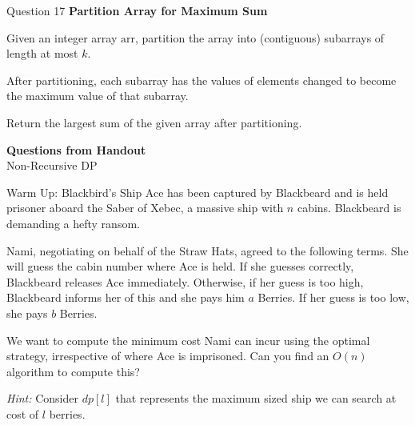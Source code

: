 \documentclass{beamer}
\begin{document}
\begin{frame}{}
\end{frame}
\begin{frame}{}
\end{frame}

\begin{frame}{Question 17}
\textbf{Partition Array for Maximum Sum}

Given an integer array $\text{arr}$, partition the array into (contiguous) subarrays of length at most $k$. 

After partitioning, each subarray has the values of elements changed to become the maximum value of that subarray.

Return the largest sum of the given array after partitioning.
\end{frame}

\begin{frame}{}
\end{frame}
\begin{frame}{}
\end{frame}


\begin{frame}
  \begin{center}
    \Large\textbf{Questions from Handout}\\
    \large Non-Recursive DP
  \end{center}
\end{frame}

\begin{frame}{Warm Up: Blackbird's Ship}
Ace has been captured by Blackbeard and is held prisoner aboard the Saber of Xebec, a massive ship with $n$ cabins. Blackbeard is demanding a hefty ransom.

\medskip
Nami, negotiating on behalf of the Straw Hats, agreed to the following terms. She will guess the cabin number where Ace is held. If she guesses correctly, Blackbeard releases Ace immediately. Otherwise, if her guess is too high, Blackbeard informs her of this and she pays him $a$ Berries. If her guess is too low, she pays $b$ Berries.

\medskip
We want to compute the minimum cost Nami can incur using the optimal strategy, irrespective of where Ace is imprisoned. Can you find an $O(n)$ algorithm to compute this?

\medskip
\textit{Hint:} Consider $dp[l]$ that represents the maximum sized ship we can search at cost of $l$ berries.
\end{frame}
\end{document}
